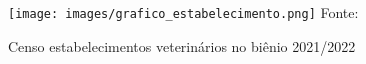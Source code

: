 \documentclass[
    12pt,               %
    openright,          %
    oneside,
    a4paper,            %
    BIBLATEX,           %
    TODO,               %
    english,            %
    brazil              %
    ]{ifsp-spo-inf-ctds}
\begin{document}
    \begin{figure}[H]
        \centering
        \caption{Censo estabelecimentos veterinários no biênio 2021/2022}
        \texttt{[image: images/grafico\_estabelecimento.png]}
        \footnotesize{ Fonte: }
        \label{fig:grafico clinicas}
    \end{figure}



     
    
    
\end{document}

